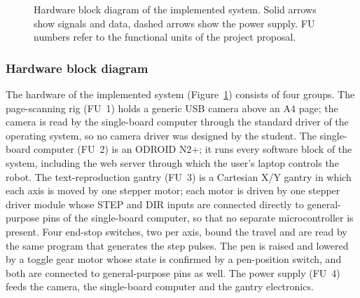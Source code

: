 \begin{figure}[!htbp]
\caption{Hardware block diagram of the implemented system. Solid arrows show signals and data, dashed arrows show the power supply. FU numbers refer to the functional units of the project proposal.}
\label{fig:des-hw}
\end{figure}

\subsubsection{Hardware block diagram}

The hardware of the implemented system (Figure~\ref{fig:des-hw}) consists of four groups.
The page-scanning rig (FU~1) holds a generic USB camera above an A4 page; the camera is read by the single-board computer through the standard driver of the operating system, so no camera driver was designed by the student.
The single-board computer (FU~2) is an ODROID N2+; it runs every software block of the system, including the web server through which the user's laptop controls the robot.
The text-reproduction gantry (FU~3) is a Cartesian X/Y gantry in which each axis is moved by one stepper motor; each motor is driven by one stepper driver module whose STEP and DIR inputs are connected directly to general-purpose pins of the single-board computer, so that no separate microcontroller is present.
Four end-stop switches, two per axis, bound the travel and are read by the same program that generates the step pulses.
The pen is raised and lowered by a toggle gear motor whose state is confirmed by a pen-position switch, and both are connected to general-purpose pins as well.
The power supply (FU~4) feeds the camera, the single-board computer and the gantry electronics.

